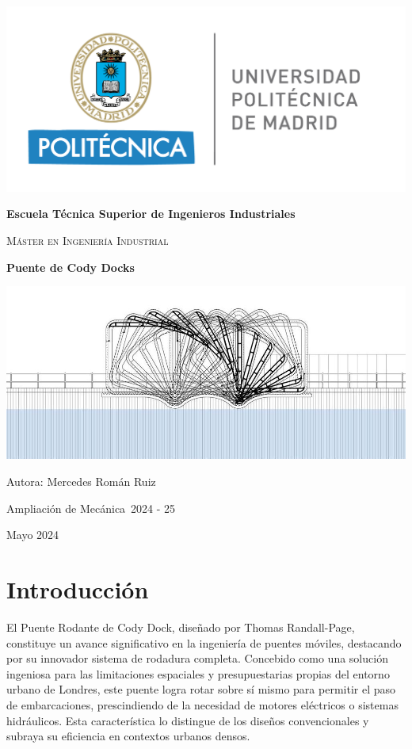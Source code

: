 \documentclass{IEEEtran}
\def\TituloProyecto{Puente de Cody Docks}
\def\Asignatura{Ampliación de Mecánica}
\def\Curso{2024 - 25}
\def\Fecha{Mayo 2024}
\begin{document}
\sloppy 
\setlength{\parindent}{30pt}
\setlength{\parskip}{6pt}
\renewcommand\thesection{\arabic{section}}
\renewcommand{\baselinestretch}{1.5}

\begin{titlepage}
    \centering
    \includegraphics[width=0.5\linewidth]{Imagenes/Logo UPM.png} \par
    \vspace{1cm}
    {\bfseries\LARGE Escuela Técnica Superior de Ingenieros Industriales \par}
    \vspace{0.5cm}
    {\scshape\Large Máster en Ingeniería Industrial \par}
    \vspace{3 cm}
    {\Huge \textbf{\TituloProyecto} \par}
    \vfill
    \includegraphics[width=0.5\linewidth]{Imagenes/Puente de Cody Docks.jpg} \par
    \vfill
    {\Large Autora: Mercedes Román Ruiz \par}
    {\Large \Asignatura \  \Curso \par}
    {\Large \Fecha \par}
\end{titlepage}

\tableofcontents

\section{Introducción}

El Puente Rodante de Cody Dock, diseñado por Thomas Randall-Page, constituye un avance significativo en la ingeniería de puentes móviles, destacando por su innovador sistema de rodadura completa. Concebido como una solución ingeniosa para las limitaciones espaciales y presupuestarias propias del entorno urbano de Londres, este puente logra rotar sobre sí mismo para permitir el paso de embarcaciones, prescindiendo de la necesidad de motores eléctricos o sistemas hidráulicos. Esta característica lo distingue de los diseños convencionales y subraya su eficiencia en contextos urbanos densos.
\end{document}
